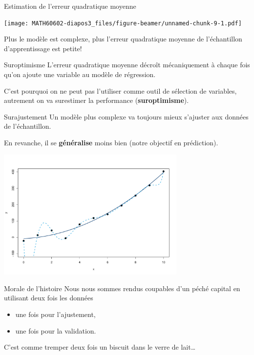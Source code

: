 \documentclass[
  ignorenonframetext,
]{beamer}
\providecommand{\tightlist}{%
  \setlength{\itemsep}{0pt}\setlength{\parskip}{0pt}}\usepackage{longtable,booktabs,array}
\begin{document}
\begin{frame}{Estimation de l'erreur quadratique moyenne}
\label{estimation-de-lerreur-quadratique-moyenne}
\begin{center}
\texttt{[image: MATH60602-diapos3\_files/figure-beamer/unnamed-chunk-9-1.pdf]}
\end{center}

Plus le modèle est complexe, plus l'erreur quadratique moyenne de
l'échantillon d'apprentissage est petite!
\end{frame}

\begin{frame}{Suroptimisme}
\label{suroptimisme}
L'erreur quadratique moyenne décroît mécaniquement à chaque fois qu'on
ajoute une variable au modèle de régression.

C'est pourquoi on ne peut pas l'utiliser comme outil de sélection de
variables, autrement on va surestimer la performance
(\textbf{suroptimisme}).
\end{frame}

\begin{frame}{Surajustement}
\label{surajustement}
Un modèle plus complexe va toujours mieux s'ajuster aux données de
l'échantillon.

En revanche, il se \textbf{généralise} moins bien (notre objectif en
prédiction).

\begin{center}
\includegraphics[width=0.7\textwidth,height=\textheight]{MATH60602-diapos3_files/figure-beamer/overfitting-1.pdf}
\end{center}
\end{frame}

\begin{frame}{Morale de l'histoire}
\label{morale-de-lhistoire}
Nous nous sommes rendus coupables d'un péché capital en utilisant deux
fois les données

\begin{itemize}
\tightlist
\item
  une fois pour l'ajustement,
\item
  une fois pour la validation.
\end{itemize}

C'est comme tremper deux fois un biscuit dans le verre de lait\ldots{}
\end{frame}
\end{document}
